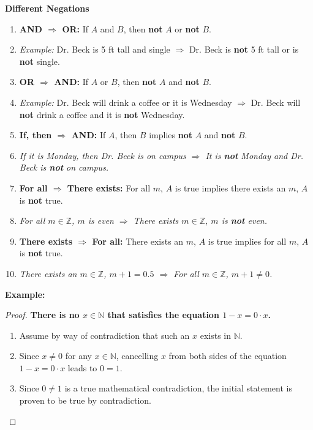 \textbf{Different Negations}
\begin{enumerate}
    \item \textbf{AND \( \Rightarrow \) OR:} If \( A \) and \( B \), then \textbf{not} \( A \) or \textbf{not} \( B \).
    \item[] \textit{Example:} Dr. Beck is 5 ft tall and single \( \Rightarrow \) Dr. Beck is \textbf{not} 5 ft tall or is \textbf{not} single.
    
    \item \textbf{OR \( \Rightarrow \) AND:} If \( A \) or \( B \), then \textbf{not} \( A \) and \textbf{not} \( B \).
    \item[] \textit{Example:} Dr. Beck will drink a coffee or it is Wednesday \( \Rightarrow \) Dr. Beck will \textbf{not} drink a coffee and it is \textbf{not} Wednesday.
    
    \item \textbf{If, then \( \Rightarrow \) AND:} If \( A \), then \( B \) implies \textbf{not} \( A \) and \textbf{not} \( B \).
    \item[] \textit{If it is Monday, then Dr. Beck is on campus \( \Rightarrow \) It is \textbf{not} Monday and Dr. Beck is \textbf{not} on campus.}
    
    \item \textbf{For all \( \Rightarrow \) There exists:} For all \( m \), \( A \) is true implies there exists an \( m \), \( A \) is \textbf{not} true.
    \item[] \textit{For all \( m \in \mathbb{Z} \), \( m \) is even \( \Rightarrow \) There exists \( m \in \mathbb{Z} \), \( m \) is \textbf{not} even.}
    
    \item \textbf{There exists \( \Rightarrow \) For all:} There exists an \( m \), \( A \) is true implies for all \( m \), \( A \) is \textbf{not} true.
    \item[] \textit{There exists an \( m \in \mathbb{Z} \), \( m + 1 = 0.5 \) \( \Rightarrow \) For all \( m \in \mathbb{Z} \), \( m + 1 \neq 0 \).}
\end{enumerate}

\textbf{Example:}
\begin{proof}
\textbf{There is no \( x \in \mathbb{N} \) that satisfies the equation \( 1 - x = 0 \cdot x \).}
\begin{enumerate}
    \item Assume by way of contradiction that such an \( x \) exists in \( \mathbb{N} \).
    \item Since \( x \neq 0 \) for any \( x \in \mathbb{N} \), cancelling \( x \) from both sides of the equation \( 1 - x = 0 \cdot x \) leads to \( 0 = 1 \).
    \item Since \( 0 \neq 1 \) is a true mathematical contradiction, the initial statement is proven to be true by contradiction. \qedhere
\end{enumerate}
\end{proof}

